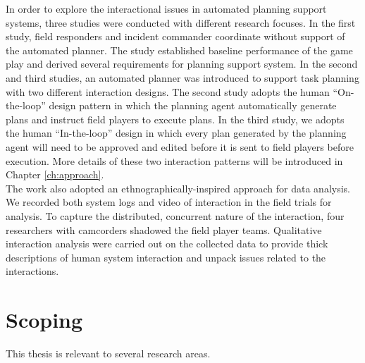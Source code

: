 In order to explore the interactional issues in automated planning support systems, three studies were conducted with different research focuses. In the first study, field responders and incident commander coordinate without support of the automated planner. The study established baseline performance of the game play and derived several requirements for planning support system. In the second and third studies, an automated planner was introduced to support task planning with two different interaction designs. The second study adopts the human ``On-the-loop'' design pattern in which the planning agent automatically generate plans and instruct field players to execute plans. In the third study, we adopts the human ``In-the-loop'' design in which every plan generated by the planning agent will need to be approved and edited before it is sent to field players before execution. More details of these two interaction patterns will be introduced in Chapter \ref{ch:approach}.\\

The work also adopted an ethnographically-inspired approach for data analysis. We recorded both system logs and video of interaction in the field trials for analysis. To capture the distributed, concurrent nature of the interaction, four researchers with camcorders shadowed the field player teams. Qualitative interaction analysis were carried out on the collected data to provide thick descriptions of human system interaction and unpack issues related to the interactions.\\


\section{Scoping}\label{sec:custom}
This thesis is relevant to several research areas. \\

